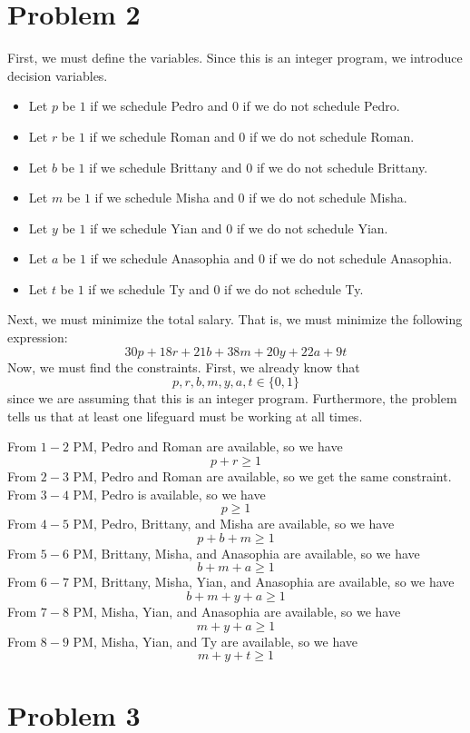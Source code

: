 \documentclass[12pt]{article}
\begin{document}
\section*{Problem 2}
First, we must define the variables. Since this is an integer program, we introduce decision variables. 
\begin{itemize}
\item Let $p$ be $1$ if we schedule Pedro and $0$ if we do not schedule Pedro. 
\item Let $r$ be $1$ if we schedule Roman and $0$ if we do not schedule Roman.
\item Let $b$ be $1$ if we schedule Brittany and $0$ if we do not schedule Brittany. 
\item Let $m$ be $1$ if we schedule Misha and $0$ if we do not schedule Misha. 
\item Let $y$ be $1$ if we schedule Yian and $0$ if we do not schedule Yian.
\item Let $a$ be $1$ if we schedule Anasophia and $0$ if we do not schedule Anasophia. 
\item Let $t$ be $1$ if we schedule Ty and $0$ if we do not schedule Ty. 
\end{itemize}
Next, we must minimize the total salary. That is, we must minimize the following expression:
\[
30p + 18r + 21b + 38m + 20y + 22a + 9t
\] Now, we must find the constraints. First, we already know that
\[
p,r,b,m,y,a,t \in \{0,1\}
\] since we are assuming that this is an integer program. Furthermore, the problem tells us that at least one lifeguard must be working at all times. 

From $1-2$ PM, Pedro and Roman are available, so we have
\[
p+r \geq 1
\] From $2-3$ PM, Pedro and Roman are available, so we get the same constraint. From $3-4$ PM, Pedro is available, so we have
\[
p \geq 1
\] From $4-5$ PM, Pedro, Brittany, and Misha are available, so we have
\[
p+b+m \geq 1
\] From $5-6$ PM, Brittany, Misha, and Anasophia are available, so we have
\[
b+m+a \geq 1
\] From $6-7$ PM, Brittany, Misha, Yian, and Anasophia are available, so we have
\[
b+m+y+a \geq 1
\] From $7-8$ PM, Misha, Yian, and Anasophia are available, so we have
\[
m+y+a\geq 1
\] From $8-9$ PM, Misha, Yian, and Ty are available, so we have
\[
m+y+t\geq 1
\] 
\newpage
\section*{Problem 3}
\end{document}
